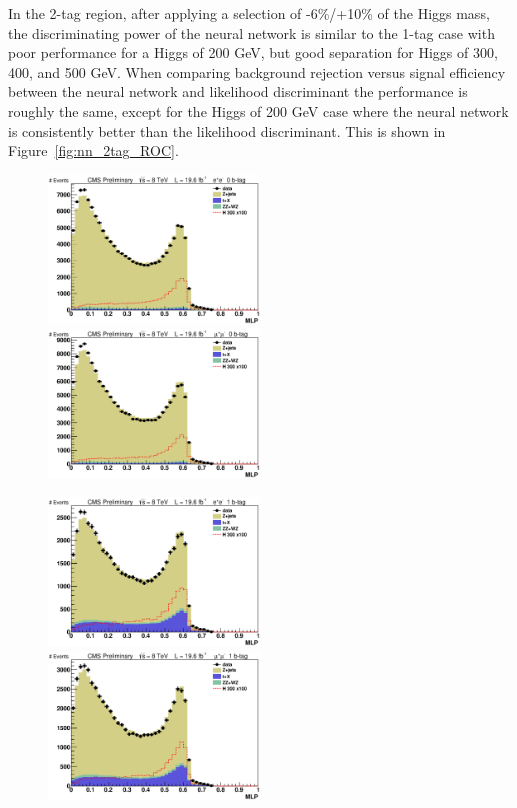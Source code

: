 In the 2-tag region, after applying a selection of -6\%/+10\% of the Higgs mass, the discriminating power of the neural network is similar to the 1-tag case with poor performance for a Higgs of 200 GeV, but good separation for Higgs of 300, 400, and 500 GeV.  When comparing background rejection versus signal efficiency between the neural network and likelihood discriminant the performance is roughly the same, except for the Higgs of 200 GeV case where the neural network is consistently better than the likelihood discriminant. This is shown in Figure~\ref{fig:nn_2tag_ROC}.


\begin{figure}[htb!]
  \centerline{
    \includegraphics[width=0.5\textwidth]{presentation/defense/images/preselection/0/el/MLP.eps}
    \includegraphics[width=0.5\textwidth]{presentation/defense/images/preselection/0/mu/MLP.eps}
  }
  \centerline{
    \includegraphics[width=0.5\textwidth]{presentation/defense/images/preselection/1/el/MLP.eps}
    \includegraphics[width=0.5\textwidth]{presentation/defense/images/preselection/1/mu/MLP.eps}
}
\end{figure}
